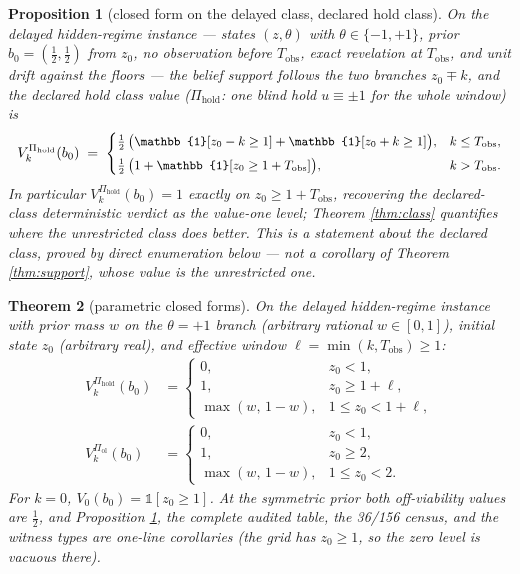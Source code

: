 \documentclass[10pt,twocolumn]{article}
\theoremstyle{plain}
\newtheorem{theorem}{Theorem}
\newtheorem{proposition}[theorem]{Proposition}
\theoremstyle{definition}
\theoremstyle{remark}
\begin{document}
\begin{proposition}[closed form on the delayed class, declared hold class]
\label{cor:closed}
On the delayed hidden-regime instance --- states \((z, \theta)\) with
\(\theta \in \{-1, +1\}\), prior \(b_{0} = (\tfrac{1}{2}, \tfrac{1}{2})\)
from \(z_{0}\), no observation before \(T_{\mathrm{obs}}\), exact
revelation at \(T_{\mathrm{obs}}\), and unit drift against the floors ---
the belief support follows the two branches \(z_{0} \mp k\), and the
\emph{declared hold class} value (\(\Pi_{\mathrm{hold}}\): one blind
hold \(u \equiv \pm 1\) for the whole window) is
\[
\small
V^{\Pi_{\mathrm{hold}}}_{k}(b_{0}) \;=\;
\begin{cases}
\tfrac{1}{2}\,\bigl(\mathbb{1}[z_{0} - k \ge 1] + \mathbb{1}[z_{0} + k \ge 1]\bigr), & k \le T_{\mathrm{obs}},\\[1ex]
\tfrac{1}{2}\,\bigl(1 + \mathbb{1}[z_{0} \ge 1 + T_{\mathrm{obs}}]\bigr), & k > T_{\mathrm{obs}}.
\end{cases}
\]
In particular \(V^{\Pi_{\mathrm{hold}}}_{k}(b_{0}) = 1\) exactly on
\(z_{0} \ge 1 + T_{\mathrm{obs}}\), recovering the declared-class
deterministic verdict as the value-one level; Theorem \ref{thm:class}
quantifies where the unrestricted class does better. This is a statement
about the declared class, proved by direct enumeration below --- not a
corollary of Theorem \ref{thm:support}, whose value is the unrestricted
one.
\end{proposition}
\begin{theorem}[parametric closed forms]\label{thm:parametric}
On the delayed hidden-regime instance with prior mass \(w\) on the
\(\theta = +1\) branch (arbitrary rational \(w \in [0,1]\)), initial
state \(z_{0}\) (arbitrary real), and effective window
\(\ell = \min(k, T_{\mathrm{obs}}) \ge 1\):
\begin{align*}
V^{\Pi_{\mathrm{hold}}}_{k}(b_{0}) &=
\begin{cases} 0, & z_{0} < 1,\\
1, & z_{0} \ge 1 + \ell,\\
\max(w,\, 1 - w), & 1 \le z_{0} < 1 + \ell,
\end{cases}
\\[0.4ex]
V^{\Pi_{\mathrm{ol}}}_{k}(b_{0}) &=
\begin{cases} 0, & z_{0} < 1,\\
1, & z_{0} \ge 2,\\
\max(w,\, 1 - w), & 1 \le z_{0} < 2.
\end{cases}
\end{align*}
For \(k = 0\), \(V_{0}(b_{0}) = \mathbb{1}[z_{0} \ge 1]\). At the
symmetric prior both off-viability values are \(\tfrac12\), and
Proposition \ref{cor:closed}, the complete audited table, the
36/156 census, and the witness types are one-line corollaries (the grid
has \(z_{0} \ge 1\), so the zero level is vacuous there).
\end{theorem}
\end{document}
